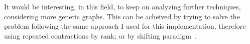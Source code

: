 \documentclass[a4paper,10pt]{article}
\begin{document}
It would be interesting, in this field, to keep on analyzing further techniques, considering more generic graphs. This can be acheived by trying to solve the problem following the same approach I used for this implementation, therefore using repeated contractions by rank; or by shifting paradigm~\cite{mst-bipartite}.

\clearpage

\printbibliography
\end{document}
